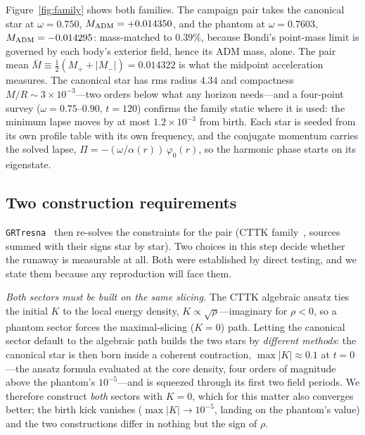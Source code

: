 \documentclass[twocolumn,floatfix,aps,prd,nofootinbib]{revtex4-2}
\begin{document}
Figure~\ref{fig:family} shows both families. The campaign pair takes the canonical star at $\omega=0.750$, $M_{\rm ADM}=+0.014350$, and the phantom at $\omega=0.7603$, $M_{\rm ADM}=-0.014295$: mass-matched to $0.39\%$, because Bondi's point-mass limit is governed by each body's exterior field, hence its ADM mass, alone. The pair mean $\bar M\equiv\tfrac12(M_+{+}|M_-|)=0.014322$ is what the midpoint acceleration measures. The canonical star has rms radius $4.34$ and compactness $M/R\sim3\times10^{-3}$---two orders below what any horizon needs---and a four-point survey ($\omega=0.75$--$0.90$, $t=120$) confirms the family static where it is used: the minimum lapse moves by at most $1.2\times10^{-3}$ from birth. Each star is seeded from its own profile table with its own frequency, and the conjugate momentum carries the solved lapse, $\Pi=-({\omega}/{\alpha(r)})\,\varphi_0(r)$, so the harmonic phase starts on its eigenstate.

\subsection{Two construction requirements}
\label{sec:construction}

\texttt{GRTresna}~\cite{grtresna} then re-solves the constraints for the pair (CTTK family~\cite{cttk}, sources summed with their signs star by star). Two choices in this step decide whether the runaway is measurable at all. Both were established by direct testing, and we state them because any reproduction will face them.

\emph{Both sectors must be built on the same slicing.} The CTTK algebraic ansatz ties the initial $K$ to the local energy density, $K\propto\sqrt{\rho}$---imaginary for $\rho<0$, so a phantom sector forces the maximal-slicing ($K=0$) path. Letting the canonical sector default to the algebraic path builds the two stars by \emph{different methods}: the canonical star is then born inside a coherent contraction, $\max|K|\approx0.1$ at $t=0$---the ansatz formula evaluated at the core density, four orders of magnitude above the phantom's $10^{-5}$---and is squeezed through its first two field periods. We therefore construct \emph{both} sectors with $K=0$, which for this matter also converges better; the birth kick vanishes ($\max|K|\to10^{-5}$, landing on the phantom's value) and the two constructions differ in nothing but the sign of $\rho$.
\end{document}

